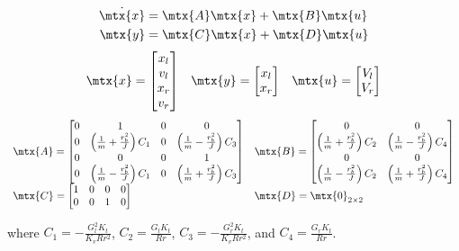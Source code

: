 \begin{theorem}
  \begin{align*}
    \dot{\mtx{x}} &= \mtx{A} \mtx{x} + \mtx{B} \mtx{u} \\
    \mtx{y} &= \mtx{C} \mtx{x} + \mtx{D} \mtx{u}
  \end{align*}
  \begin{equation*}
    \begin{array}{ccc}
      \mtx{x} =
      \begin{bmatrix}
        x_l \\
        v_l \\
        x_r \\
        v_r
      \end{bmatrix} &
      \mtx{y} =
      \begin{bmatrix}
        x_l \\
        x_r
      \end{bmatrix} &
      \mtx{u} =
      \begin{bmatrix}
        V_l \\
        V_r
      \end{bmatrix}
    \end{array}
  \end{equation*}
  \begin{equation}
    \label{eq:drivetrain_ss_model}
    \begin{array}{ll}
      \mtx{A} =
      \begin{bmatrix}
        0 & 1 & 0 & 0 \\
        0 & \left(\frac{1}{m} + \frac{r_b^2}{J}\right) C_1 & 0 & \left(\frac{1}{m} - \frac{r_b^2}{J}\right) C_3 \\
        0 & 0 & 0 & 1 \\
        0 & \left(\frac{1}{m} - \frac{r_b^2}{J}\right) C_1 & 0 & \left(\frac{1}{m} + \frac{r_b^2}{J}\right) C_3
      \end{bmatrix} &
      \mtx{B} =
      \begin{bmatrix}
        0 & 0 \\
        \left(\frac{1}{m} + \frac{r_b^2}{J}\right) C_2 & \left(\frac{1}{m} - \frac{r_b^2}{J}\right) C_4 \\
        0 & 0 \\
        \left(\frac{1}{m} - \frac{r_b^2}{J}\right) C_2 & \left(\frac{1}{m} + \frac{r_b^2}{J}\right) C_4
      \end{bmatrix} \\
      \mtx{C} =
      \begin{bmatrix}
        1 & 0 & 0 & 0 \\
        0 & 0 & 1 & 0 \\
      \end{bmatrix} &
      \mtx{D} = \mtx{0}_{2 \times 2}
    \end{array}
  \end{equation}

  where $C_1 = -\frac{G_l^2 K_t}{K_v R r^2}$, $C_2 = \frac{G_l K_t}{Rr}$,
  $C_3 = -\frac{G_r^2 K_t}{K_v R r^2}$, and $C_4 = \frac{G_r K_t}{Rr}$.
\end{theorem}

